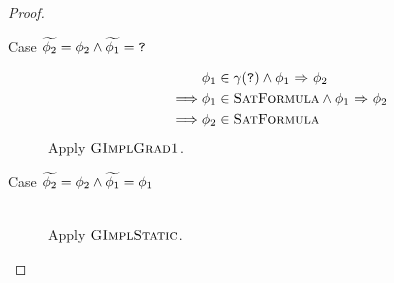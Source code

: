 \begin{proof}
\begin{description}
\begin{description}
            \item[Case $\widetilde{\phi_2} = \phi_2 \wedge \widetilde{\phi_1} = \textup{\texttt{?}}$]
            \begin{align*}
            &\phi_1 \in \gamma(\textup{\texttt{?}}) \wedge {\phi_1} \,\,{\Rightarrow}\,\, {\phi_2}\\
            \implies
            &\phi_1 \in \textup{\textsc{SatFormula}} \wedge {\phi_1} \,\,{\Rightarrow}\,\, {\phi_2}\\
            \implies
            &\phi_2 \in \textup{\textsc{SatFormula}}
            \end{align*}
            Apply $\textup{\textsc{GImplGrad1}}$.
            
            \item[Case $\widetilde{\phi_2} = \phi_2 \wedge \widetilde{\phi_1} = \phi_1$]~\\
            Apply $\textup{\textsc{GImplStatic}}$.
        \end{description}
    \end{description}
\end{proof}

